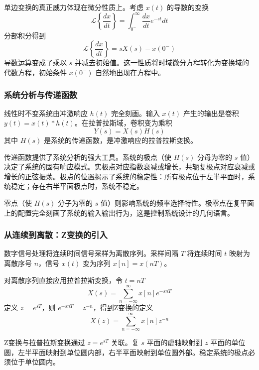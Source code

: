 单边变换的真正威力体现在微分性质上。考虑 $x(t)$ 的导数的变换
\begin{equation}
    \mathcal{L}\left\{\frac{dx}{dt}\right\} = \int_{0^-}^{\infty} \frac{dx}{dt} e^{-st} dt
\end{equation}
分部积分得到
\begin{equation}
    \mathcal{L}\left\{\frac{dx}{dt}\right\} = sX(s) - x(0^-)
\end{equation}
导数运算变成了乘以 $s$ 并减去初始值。这一性质将时域微分方程转化为变换域的代数方程，初始条件 $x(0^-)$ 自然地出现在方程中。

\subsubsection{系统分析与传递函数}

线性时不变系统由冲激响应 $h(t)$ 完全刻画。输入 $x(t)$ 产生的输出是卷积 $y(t) = x(t) * h(t)$。在拉普拉斯域，卷积变为乘积
\begin{equation}
    Y(s) = X(s) H(s)
\end{equation}
其中 $H(s)$ 是系统的传递函数，是冲激响应的拉普拉斯变换。

传递函数提供了系统分析的强大工具。系统的极点（使 $H(s)$ 分母为零的 $s$ 值）决定了系统的固有响应模式。实极点对应指数衰减或增长，共轭复极点对应衰减或增长的正弦振荡。极点的位置揭示了系统的稳定性：所有极点位于左半平面时，系统稳定；存在右半平面极点时，系统不稳定。

零点（使 $H(s)$ 分子为零的 $s$ 值）则影响系统的频率选择特性。极零点在复平面上的配置完全刻画了系统的输入输出行为，这是控制系统设计的几何语言。

\subsubsection{从连续到离散：Z变换的引入}

数字信号处理将连续时间信号采样为离散序列。采样间隔 $T$ 将连续时间 $t$ 映射为离散序号 $n$，信号 $x(t)$ 变为序列 $x[n] = x(nT)$。

对离散序列直接应用拉普拉斯变换，令 $t = nT$
\begin{equation}
    X(s) = \sum_{n=-\infty}^{\infty} x[n] e^{-snT}
\end{equation}
定义 $z = e^{sT}$，则 $e^{-snT} = z^{-n}$，得到Z变换的定义
\begin{equation}
    X(z) = \sum_{n=-\infty}^{\infty} x[n] z^{-n}
\end{equation}

Z变换与拉普拉斯变换通过 $z = e^{sT}$ 关联。复 $s$ 平面的虚轴映射到 $z$ 平面的单位圆，左半平面映射到单位圆内部，右半平面映射到单位圆外部。稳定系统的极点必须位于单位圆内。

